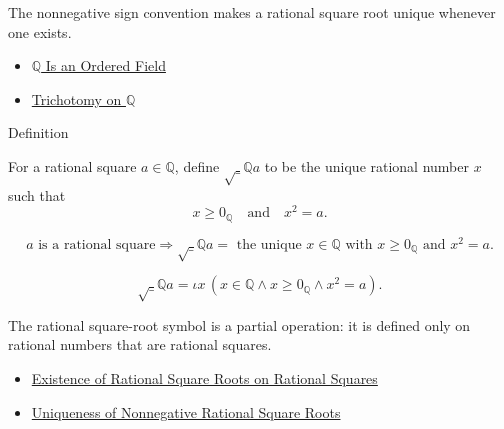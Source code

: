 \begin{remark*}[Interpretation]
The nonnegative sign convention makes a rational square root unique whenever
one exists.
\end{remark*}

\begin{dependencies}
\begin{itemize}
  \item \hyperref[thm:q-is-an-ordered-field]{$\mathbb{Q}$ Is an Ordered Field}
  \item \hyperref[thm:trichotomy-on-q]{Trichotomy on $\mathbb{Q}$}
\end{itemize}
\end{dependencies}

\begin{definitionbox}{Definition}
\begin{definition}
\label{def:rational-square-root}
For a rational square $a\in\mathbb{Q}$, define $\sqrt_{\mathbb{Q}}{a}$ to be
the unique rational number $x$ such that
\[
x\ge 0_{\mathbb{Q}}
\quad\text{and}\quad
x^2=a.
\]
\end{definition}
\end{definitionbox}

\begin{remark*}
\[
\text{$a$ is a rational square}
\Rightarrow
\sqrt_{\mathbb{Q}}{a}
=\text{ the unique }x\in\mathbb{Q}\text{ with }x\ge0_{\mathbb{Q}}\text{ and }x^2=a.
\]
\end{remark*}

\begin{remark*}
\[
\sqrt_{\mathbb{Q}}{a}
=\iota x\,(x\in\mathbb{Q}\land x\ge0_{\mathbb{Q}}\land x^2=a).
\]
\end{remark*}

\begin{remark*}[Interpretation]
The rational square-root symbol is a partial operation: it is defined only on
rational numbers that are rational squares.
\end{remark*}

\begin{dependencies}
\begin{itemize}
  \item \hyperref[thm:rational-square-root-exists-on-rational-squares]{Existence of Rational Square Roots on Rational Squares}
  \item \hyperref[thm:uniqueness-of-nonnegative-rational-square-roots]{Uniqueness of Nonnegative Rational Square Roots}
\end{itemize}
\end{dependencies}


